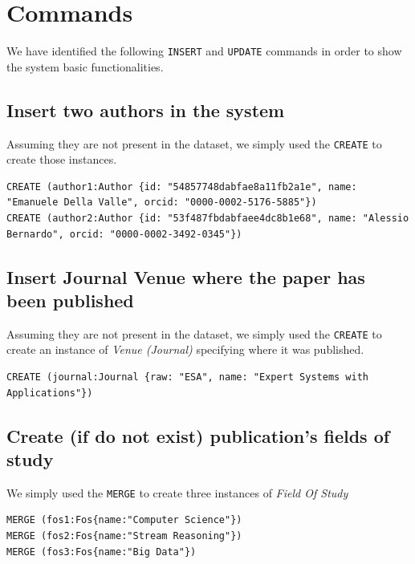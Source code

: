 \documentclass{Configuration_Files/PoliMi3i_thesis}
\begin{document}
\section{Commands}
We have identified the following \verb |INSERT| and \verb |UPDATE| commands in order to show the system basic functionalities.

\subsection{Insert two authors in the system}
Assuming they are not present in the dataset, we simply used the \verb |CREATE| to create those instances.
\begin{lstlisting}[language=cypher, label=lst:cypher-example]
CREATE (author1:Author {id: "54857748dabfae8a11fb2a1e", name: "Emanuele Della Valle", orcid: "0000-0002-5176-5885"})
CREATE (author2:Author {id: "53f487fbdabfaee4dc8b1e68", name: "Alessio Bernardo", orcid: "0000-0002-3492-0345"})
\end{lstlisting}

\subsection{Insert Journal Venue where the paper has been published}
Assuming they are not present in the dataset, we simply used the \verb |CREATE| to create an instance of \emph{Venue (Journal)}
specifying where it was published.
\begin{lstlisting}[language=cypher, label=lst:cypher-example]
CREATE (journal:Journal {raw: "ESA", name: "Expert Systems with Applications"})
\end{lstlisting}

\subsection{Create (if do not exist) publication's fields of study}
We simply used the \verb |MERGE| to create three instances of \emph{Field Of Study}
\begin{lstlisting}[language=cypher, label=lst:cypher-example]
MERGE (fos1:Fos{name:"Computer Science"})
MERGE (fos2:Fos{name:"Stream Reasoning"})
MERGE (fos3:Fos{name:"Big Data"})
\end{lstlisting}
\end{document}
